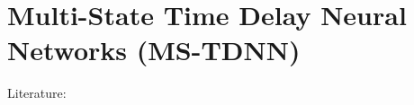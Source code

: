 \section{Multi-State Time Delay Neural Networks (MS-TDNN)}\label{sec:ms-tdnn}
Literature: \cite{Haffner1992,Hild1993}
